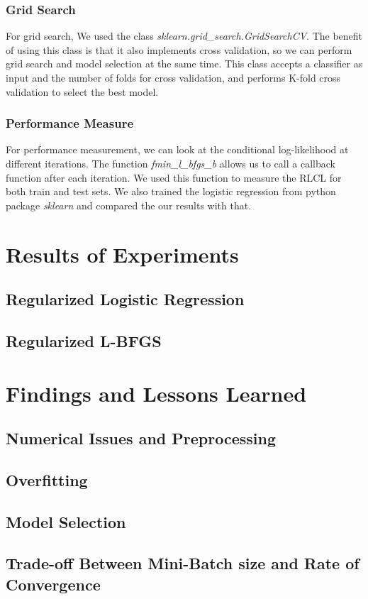 \documentclass[twoside,12pt]{article}
\begin{document}
\subsubsection{Grid Search}
For grid search, We used the class {\it sklearn.grid\_search.GridSearchCV}. The benefit of using this class is that it also implements cross validation, so we can perform grid search and model selection at the same time. This class accepts a classifier as input and the number of folds for cross validation, and performs K-fold cross validation to select the best model.
\subsubsection{Performance Measure}
For performance measurement, we can look at the conditional log-likelihood at different iterations. The function {\it fmin\_l\_bfgs\_b} allows us to call a callback function after each iteration. We used this function to measure the RLCL for both train and test sets. We also trained the logistic regression from python package {\it sklearn} and compared the our results with that.
\section{Results of Experiments}
\subsection{Regularized Logistic Regression}
\subsection{ Regularized L-BFGS}

\section{Findings and Lessons Learned}
\subsection{Numerical Issues and Preprocessing}
\subsection{Overfitting}
\subsection{Model Selection}
\subsection{Trade-off Between Mini-Batch size and Rate of Convergence}
\end{document}
